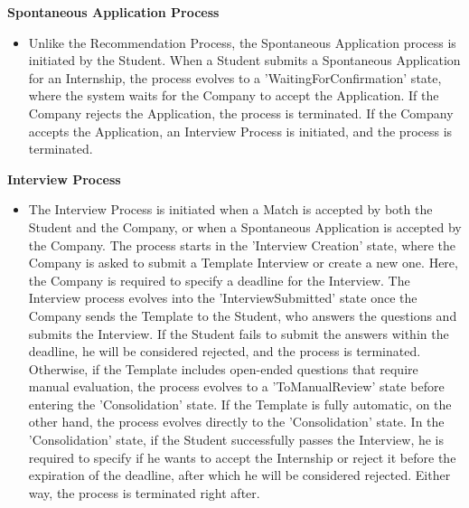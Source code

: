 \textbf{Spontaneous Application Process}\\
\begin{itemize}
    \item Unlike the Recommendation Process, the Spontaneous Application process is initiated by the Student. When a Student submits a Spontaneous Application for an Internship, the process evolves to a 'WaitingForConfirmation' state, where the system waits for the Company to accept the Application. If the Company rejects the Application, the process is terminated. If the Company accepts the Application, an Interview Process is initiated, and the process is terminated.
\end{itemize}

\textbf{Interview Process}\\
\begin{itemize}
    \item The Interview Process is initiated when a Match is accepted by both the Student and the Company, or when a Spontaneous Application is accepted by the Company. The process starts in the 'Interview Creation' state, where the Company is asked to submit a Template Interview or create a new one. Here, the Company is required to specify a deadline for the Interview. The Interview process evolves into the 'InterviewSubmitted' state once the Company sends the Template to the Student, who answers the questions and submits the Interview. If the Student fails to submit the answers within the deadline, he will be considered rejected, and the process is terminated. Otherwise, if the Template includes open-ended questions that require manual evaluation, the process evolves to a 'ToManualReview' state before entering the 'Consolidation' state. If the Template is fully automatic, on the other hand, the process evolves directly to the 'Consolidation' state. In the 'Consolidation' state, if the Student successfully passes the Interview, he is required to specify if he wants to accept the Internship or reject it before the expiration of the deadline, after which he will be considered rejected. Either way, the process is terminated right after.
\end{itemize}

